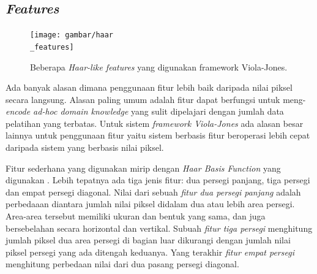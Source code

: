 \subsection{\emph{Features}}

\begin{figure}[H]
  \centering{}
	\texttt{[image: gambar/haar\\\_features]}
  \caption{Beberapa \emph{Haar-like features} yang digunakan framework Viola-Jones.}
\end{figure}

Ada banyak alasan dimana penggunaan fitur lebih baik daripada 
nilai piksel secara langsung. Alasan paling umum adalah fitur dapat berfungsi
untuk meng-\emph{encode ad-hoc domain knowledge} yang sulit dipelajari 
dengan jumlah data pelatihan yang terbatas. Untuk sistem \emph{framework Viola-Jones} 
ada alasan besar lainnya untuk penggunaan fitur yaitu sistem berbasis fitur beroperasi lebih cepat
daripada sistem yang berbasis nilai piksel.

Fitur sederhana yang digunakan mirip dengan \emph{Haar Basis Function} yang 
digunakan \cite{papaetal}. Lebih tepatnya ada tiga jenis fitur: dua persegi panjang, tiga persegi dan 
empat persegi diagonal. 
Nilai dari sebuah \emph{fitur dua persegi panjang} adalah perbedaaan diantara 
jumlah nilai piksel didalam dua atau lebih area persegi. Area-area tersebut memiliki 
ukuran dan bentuk yang sama, dan juga bersebelahan secara horizontal dan vertikal.
Subuah \emph{fitur tiga persegi} menghitung jumlah piksel dua area persegi 
di bagian luar dikurangi dengan jumlah nilai piksel persegi yang ada ditengah keduanya. 
Yang terakhir \emph{fitur empat persegi} menghitung perbedaan nilai dari dua pasang 
persegi diagonal.



